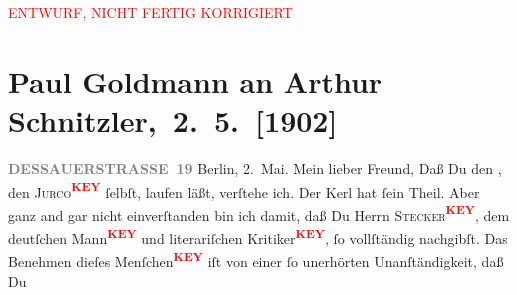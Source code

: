 
\begin{center}
            \textcolor{red}{ENTWURF, NICHT FERTIG KORRIGIERT}
                      \end{center}
            
         
         \renewcommand{\erwaehntePersonen}{Personen: Gerhart Hauptmann, Olga Schnitzler, Karl Schönherr}
         \renewcommand{\erwaehnteInstitutionen}{Institutionen: Tägliche Rundschau}
         \renewcommand{\erwaehnteOrte}{Orte: Berlin, Brühl, Dessauer Straße, Deutschland, Wien}
         \renewcommand{\erwaehnteWerke}{Werke: Der Sonnwendtag. Drama in fünf Akten, Die Weber, Tägliche Rundschau}
               \section[ Paul Goldmann an Arthur Schnitzler, 2. 5. {[}1902{]}]{ Paul Goldmann an Arthur Schnitzler, 2. 5. {[}1902{]}}\nopagebreak{}\rehead{ }\begin{ledgroupsized}[t]{13cm}\normalsize\beginnumbering \toendnotes[C]{\smallbreak\pagebreak[2]} 
\toendnotes[C]{\smallbreak}\pstart
           \noindent{}\raggedleft{}{\pb}\textcolor{gray}{\textbf{DESSAUERSTRASSE 19}}\pend
           \pstart
           Berlin, 2. Mai.\pend
           \pstart\center{}Mein lieber Freund,\pend\pstart
           Daß Du den \label{K_L03206-1v}\label{K_L03206-1h}, den \textsc{Jurco\textcolor{red}{\textsuperscript{\textbf{KEY}}}} ſelbſt, laufen läßt, verſtehe ich. Der Kerl hat ſein Theil. Aber ganz and
                    gar nicht einverſtanden bin ich damit, daß Du Herrn \textsc{Stecker\textcolor{red}{\textsuperscript{\textbf{KEY}}}}, dem deutſchen Mann\textcolor{red}{\textsuperscript{\textbf{KEY}}} und
                    literariſchen Kritiker\textcolor{red}{\textsuperscript{\textbf{KEY}}}, ſo
                    vollſtändig nachgibſt. Das Benehmen dieſes Menſchen\textcolor{red}{\textsuperscript{\textbf{KEY}}} iſt von einer ſo unerhörten Unanſtändigkeit, daß Du

\end{ledgroupsized}
